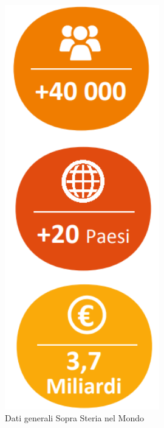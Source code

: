 \begin{figure}[htbp]
\centering
\begin{minipage}[c]{.40\textwidth}
\centering\setlength{\captionmargin}{0pt}%
\includegraphics[width=0.6\textwidth]{immagini/dipendenti_paesi_fatturato_mondo}
\caption{Dati generali Sopra Steria nel Mondo}
\end{minipage}%
\hspace{10mm}%
\begin{minipage}[c]{.40\textwidth}
\centering\setlength{\captionmargin}{0pt}%

\end{minipage}
\end{figure}
